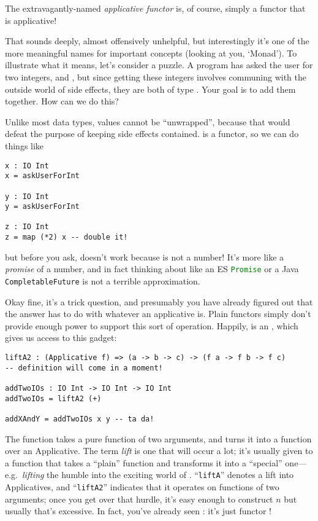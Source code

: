 The extravagantly-named \emph{applicative functor} is, of course, simply a functor that is applicative!

That sounds deeply, almost offensively unhelpful, but interestingly it's one of the more meaningful names for important concepts (looking at you, `Monad'). To illustrate what it means, let's consider a puzzle. A program has asked the user for two integers,  and , but since getting these integers involves communing with the outside world of side effects, they are both of type . Your goal is to add them together. How can we do this?

Unlike most data types,  values cannot be ``unwrapped'', because that would defeat the purpose of keeping side effects contained.  is a functor, so we can do things like

\begin{lstlisting}[language=pseudoml]
x : IO Int
x = askUserForInt

y : IO Int
y = askUserForInt

z : IO Int
z = map (*2) x -- double it!
\end{lstlisting}

\noindent but before you ask,  doesn't work because  is not a number! It's more like a \emph{promise} of a number, and in fact thinking about  like an ES \lstinline[language=js]|Promise| or a Java \lstinline[language=java]|CompletableFuture| is not a terrible approximation.

Okay fine, it's a trick question, and presumably you have already figured out that the answer has to do with whatever an applicative is. Plain functors simply don't provide enough power to support this sort of operation. Happily,  is an , which gives us access to this gadget:

\begin{lstlisting}[language=pseudoml]
liftA2 : (Applicative f) => (a -> b -> c) -> (f a -> f b -> f c)
-- definition will come in a moment!

addTwoIOs : IO Int -> IO Int -> IO Int
addTwoIOs = liftA2 (+)

addXAndY = addTwoIOs x y -- ta da!
\end{lstlisting}

The function  takes a pure function of two arguments, and turns it into a function over an Applicative. The term \emph{lift} is one that will occur a lot; it's usually given to a function that takes a ``plain'' function and transforms it into a ``special'' one---e.g.\ \emph{lifting} the humble \mlil{(+)} into the exciting world of . ``\texttt{liftA}'' denotes a lift into Applicatives, and ``\texttt{liftA2}'' indicates that it operates on functions of two arguments; once you get over that hurdle, it's easy enough to construct \( n \) but usually that's excessive. In fact, you've already seen : it's just functor !

